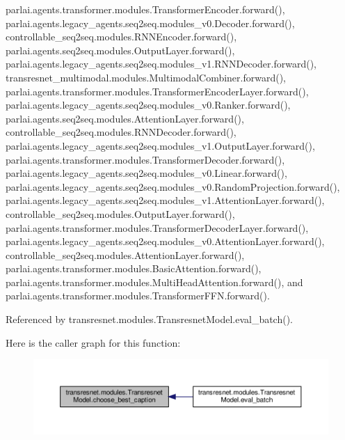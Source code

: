 parlai.\+agents.\+transformer.\+modules.\+Transformer\+Encoder.\+forward(), parlai.\+agents.\+legacy\+\_\+agents.\+seq2seq.\+modules\+\_\+v0.\+Decoder.\+forward(), controllable\+\_\+seq2seq.\+modules.\+R\+N\+N\+Encoder.\+forward(), parlai.\+agents.\+seq2seq.\+modules.\+Output\+Layer.\+forward(), parlai.\+agents.\+legacy\+\_\+agents.\+seq2seq.\+modules\+\_\+v1.\+R\+N\+N\+Decoder.\+forward(), transresnet\+\_\+multimodal.\+modules.\+Multimodal\+Combiner.\+forward(), parlai.\+agents.\+transformer.\+modules.\+Transformer\+Encoder\+Layer.\+forward(), parlai.\+agents.\+legacy\+\_\+agents.\+seq2seq.\+modules\+\_\+v0.\+Ranker.\+forward(), parlai.\+agents.\+seq2seq.\+modules.\+Attention\+Layer.\+forward(), controllable\+\_\+seq2seq.\+modules.\+R\+N\+N\+Decoder.\+forward(), parlai.\+agents.\+legacy\+\_\+agents.\+seq2seq.\+modules\+\_\+v1.\+Output\+Layer.\+forward(), parlai.\+agents.\+transformer.\+modules.\+Transformer\+Decoder.\+forward(), parlai.\+agents.\+legacy\+\_\+agents.\+seq2seq.\+modules\+\_\+v0.\+Linear.\+forward(), parlai.\+agents.\+legacy\+\_\+agents.\+seq2seq.\+modules\+\_\+v0.\+Random\+Projection.\+forward(), parlai.\+agents.\+legacy\+\_\+agents.\+seq2seq.\+modules\+\_\+v1.\+Attention\+Layer.\+forward(), controllable\+\_\+seq2seq.\+modules.\+Output\+Layer.\+forward(), parlai.\+agents.\+transformer.\+modules.\+Transformer\+Decoder\+Layer.\+forward(), parlai.\+agents.\+legacy\+\_\+agents.\+seq2seq.\+modules\+\_\+v0.\+Attention\+Layer.\+forward(), controllable\+\_\+seq2seq.\+modules.\+Attention\+Layer.\+forward(), parlai.\+agents.\+transformer.\+modules.\+Basic\+Attention.\+forward(), parlai.\+agents.\+transformer.\+modules.\+Multi\+Head\+Attention.\+forward(), and parlai.\+agents.\+transformer.\+modules.\+Transformer\+F\+F\+N.\+forward().



Referenced by transresnet.\+modules.\+Transresnet\+Model.\+eval\+\_\+batch().

Here is the caller graph for this function\+:
\nopagebreak
\begin{figure}[H]
\begin{center}
\leavevmode
\includegraphics[width=350pt]{classtransresnet_1_1modules_1_1TransresnetModel_a9db8fd3e6b80ef4f17a9975673e46d01_icgraph}
\end{center}
\end{figure}
\mbox{\label{classtransresnet_1_1modules_1_1TransresnetModel_ad41dbceaf0c86aac1b29e68fea3c4f14}} 
